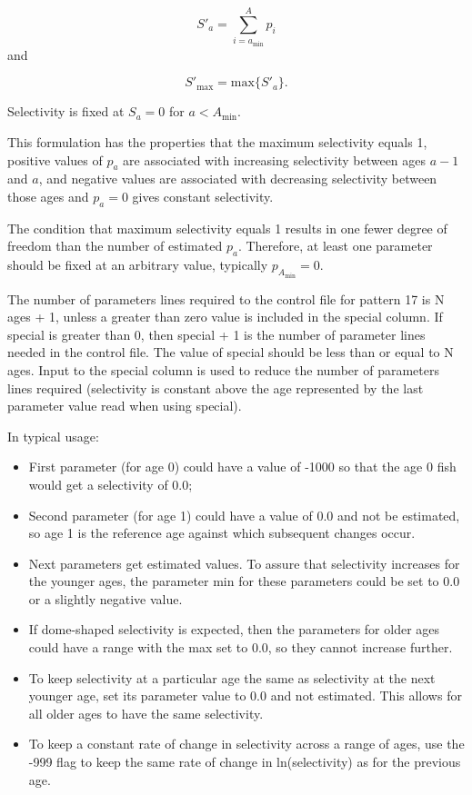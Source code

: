 	\begin{equation}
	S'_a = \sum_{i = a_{\text{min}}}^A p_i
	\end{equation}
and
 
	\begin{equation}
	S'_{\text{max}} = \mbox{max} \{S'_a\}.
	\end{equation}

Selectivity is fixed at $S_a = 0$ for $a < A_{\text{min}}$. 
	
This formulation has the properties that the maximum selectivity equals 1, positive values of $p_a$ are associated with increasing selectivity between ages $a-1$ and $a$, and negative values are associated with decreasing selectivity between those ages and $p_a = 0$ gives constant selectivity.
	
The condition that maximum selectivity equals 1 results in one fewer degree of freedom than the number of estimated $p_a$. Therefore, at least one parameter should be fixed at an arbitrary value, typically $p_{A_{\text{min}}}=0$.

The number of parameters lines required to the control file for pattern 17 is N ages + 1, unless a greater than zero value is included in the special column. If special is greater than 0, then special + 1 is the number of parameter lines needed in the control file. The value of special should be less than or equal to N ages. Input to the special column is used to reduce the number of parameters lines required (selectivity is constant above the age represented by the last parameter value read when using special). 
	
In typical usage:
	\begin{itemize}
		\item First parameter (for age 0) could have a value of -1000 so that the age 0 fish would get a selectivity of 0.0;
		\item Second parameter (for age 1) could have a value of 0.0 and not be estimated, so age 1 is the reference age against which subsequent changes occur.
		\item Next parameters get estimated values. To assure that selectivity increases for the younger ages, the parameter min for these parameters could be set to 0.0 or a slightly negative value.
		\item If dome-shaped selectivity is expected, then the parameters for older ages could have a range with the max set to 0.0, so they cannot increase further.
		\item To keep selectivity at a particular age the same as selectivity at the next younger age, set its parameter value to 0.0 and not estimated. This allows for all older ages to have the same selectivity.
		\item To keep a constant rate of change in selectivity across a range of ages, use the -999 flag to keep the same rate of change in ln(selectivity) as for the previous age.
	\end{itemize}

